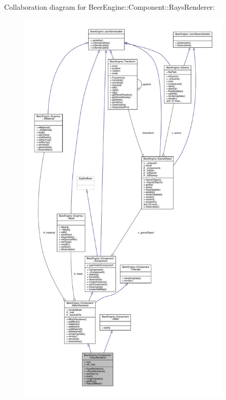 Collaboration diagram for Beer\+Engine\+:\+:Component\+:\+:Rays\+Renderer\+:\nopagebreak
\begin{figure}[H]
\begin{center}
\leavevmode
\includegraphics[height=550pt]{class_beer_engine_1_1_component_1_1_rays_renderer__coll__graph}
\end{center}
\end{figure}
